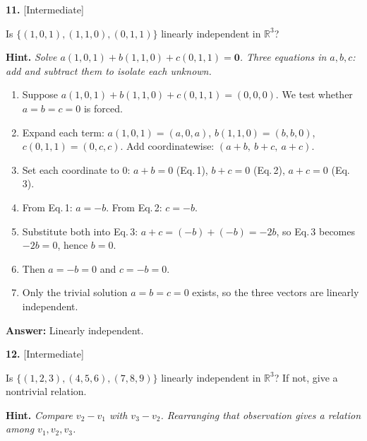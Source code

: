 \documentclass[11pt]{article}
\begin{document}
\par\vspace{2pt}
\begin{minipage}{\linewidth}\textbf{11.} \hfill{\scriptsize\color{ink}[Intermediate]}\par\nopagebreak Is $\{(1,0,1),(1,1,0),(0,1,1)\}$ linearly independent in $\mathbb{R}^{3}$?
\par\smallskip\begingroup\small\color{ink}\textbf{Hint.} \textit{Solve $a(1,0,1)+b(1,1,0)+c(0,1,1)=\mathbf 0$. Three equations in $a,b,c$: add and subtract them to isolate each unknown.}\endgroup
\end{minipage}\par\nopagebreak
\begin{tcolorbox}[breakable,colback=ans,colframe=ansb,boxrule=0.5pt,left=4pt,right=4pt,top=2pt,bottom=2pt]\begin{enumerate}[leftmargin=2.2em,itemsep=1pt,topsep=1pt,label=\textbf{Step \arabic*.}]\item Suppose $a(1,0,1)+b(1,1,0)+c(0,1,1)=(0,0,0)$. We test whether $a=b=c=0$ is forced.
\item Expand each term: $a(1,0,1)=(a,0,a)$, $b(1,1,0)=(b,b,0)$, $c(0,1,1)=(0,c,c)$. Add coordinatewise: $(a+b,\ b+c,\ a+c)$.
\item Set each coordinate to $0$: $a+b=0$ \quad (Eq.\,1), \quad $b+c=0$ \quad (Eq.\,2), \quad $a+c=0$ \quad (Eq.\,3).
\item From Eq.\,1: $a=-b$. From Eq.\,2: $c=-b$.
\item Substitute both into Eq.\,3: $a+c=(-b)+(-b)=-2b$, so Eq.\,3 becomes $-2b=0$, hence $b=0$.
\item Then $a=-b=0$ and $c=-b=0$.
\item Only the trivial solution $a=b=c=0$ exists, so the three vectors are linearly independent.
\end{enumerate}\textbf{Answer:} Linearly independent.\end{tcolorbox}
\par\vspace{2pt}
\begin{minipage}{\linewidth}\textbf{12.} \hfill{\scriptsize\color{ink}[Intermediate]}\par\nopagebreak Is $\{(1,2,3),(4,5,6),(7,8,9)\}$ linearly independent in $\mathbb{R}^{3}$? If not, give a nontrivial relation.
\par\smallskip\begingroup\small\color{ink}\textbf{Hint.} \textit{Compare $v_2-v_1$ with $v_3-v_2$. Rearranging that observation gives a relation among $v_1,v_2,v_3$.}\endgroup
\end{minipage}\par\nopagebreak
\end{document}

